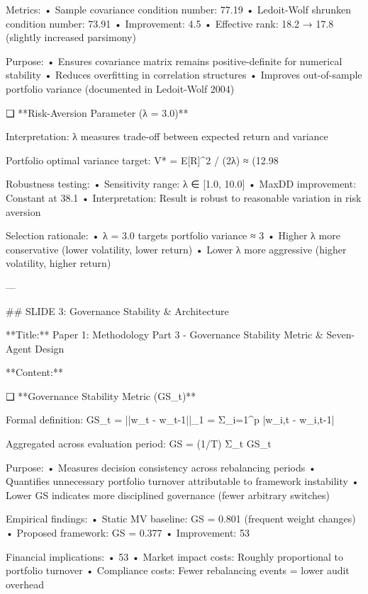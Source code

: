 Metrics:
   • Sample covariance condition number: 77.19
   • Ledoit-Wolf shrunken condition number: 73.91
   • Improvement: 4.5%
   • Effective rank: 18.2 → 17.8 (slightly increased parsimony)

Purpose:
   • Ensures covariance matrix remains positive-definite for numerical stability
   • Reduces overfitting in correlation structures
   • Improves out-of-sample portfolio variance (documented in Ledoit-Wolf 2004)

❑ **Risk-Aversion Parameter (λ = 3.0)**

Interpretation: λ measures trade-off between expected return and variance

Portfolio optimal variance target: V* = E[R]^2 / (2λ) ≈ (12.98%

Robustness testing:
   • Sensitivity range: λ ∈ [1.0, 10.0]
   • MaxDD improvement: Constant at 38.1%
   • Interpretation: Result is robust to reasonable variation in risk aversion

Selection rationale:
   • λ = 3.0 targets portfolio variance ≈ 3%
   • Higher λ more conservative (lower volatility, lower return)
   • Lower λ more aggressive (higher volatility, higher return)

---

## SLIDE 3: Governance Stability & Architecture

**Title:** Paper 1: Methodology Part 3 - Governance Stability Metric & Seven-Agent Design

**Content:**

❑ **Governance Stability Metric (GS_t)**

Formal definition: GS_t = ||w_t - w_{t-1}||_1 = Σ_{i=1}^p |w_{i,t} - w_{i,t-1}|

Aggregated across evaluation period: GS = (1/T) Σ_t GS_t

Purpose:
   • Measures decision consistency across rebalancing periods
   • Quantifies unnecessary portfolio turnover attributable to framework instability
   • Lower GS indicates more disciplined governance (fewer arbitrary switches)

Empirical findings:
   • Static MV baseline: GS = 0.801 (frequent weight changes)
   • Proposed framework: GS = 0.377
   • Improvement: 53%

Financial implications:
   • 53%
   • Market impact costs: Roughly proportional to portfolio turnover
   • Compliance costs: Fewer rebalancing events = lower audit overhead

